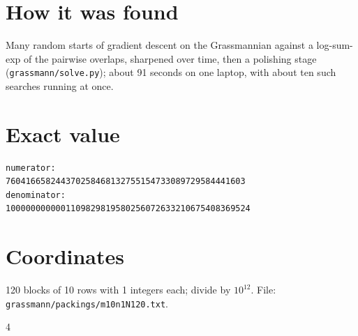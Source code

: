 \documentclass[11pt,a4paper]{article}
\begin{document}
\section{How it was found}
Many random starts of gradient descent on the Grassmannian against a log-sum-exp of the pairwise overlaps, sharpened over time, then a polishing stage (\texttt{grassmann/solve.py}); about 91 seconds on one laptop, with about ten such searches running at once.


\appendix
\section{Exact value}
{\small
\begin{verbatim}
numerator:
760416658244370258468132755154733089729584441603
denominator:
1000000000001109829819580256072633210675408369524
\end{verbatim}}

\section{Coordinates}
120 blocks of 10 rows with 1 integers each; divide by $10^{12}$. File: \texttt{grassmann/packings/m10n1N120.txt}.
{\tiny
\begin{multicols}{4}
\end{multicols}}
\end{document}
